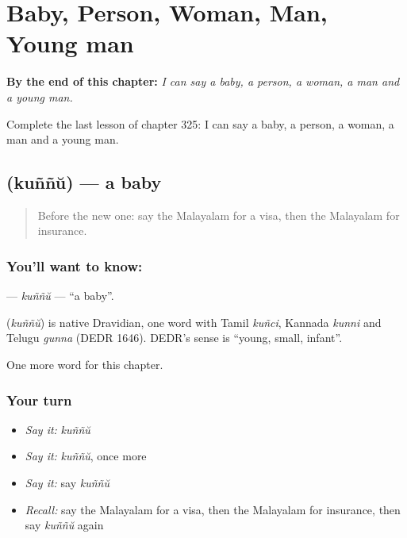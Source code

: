
\chapter{Baby, Person, Woman, Man, Young man}
\label{ch:ml-baby-person-woman-man-young-man}

\begin{chapteropening}
\textbf{By the end of this chapter:} \emph{I can say a baby, a person, a woman, a man and a young man.}

Complete the last lesson of chapter 325: I can say a baby, a person, a woman, a man and a young man.
\end{chapteropening}

\section[\texorpdfstring{\ml{കുഞ്ഞ്} (kuññŭ)}{കുഞ്ഞ് (kuññŭ)}]{ (kuññŭ) — a baby}

\label{lesson:ML-C325-kunnu2}



\begin{quote}
Before the new one: say the Malayalam for a visa, then the Malayalam for insurance.
\end{quote}

\subsection*{You'll want to know: }
\textbf{} — \emph{kuññŭ} — \textquotedblleft{}a baby\textquotedblright{}.

\begin{cousinweb}
\textbf{} (\emph{kuññŭ}) is native Dravidian, one word with Tamil \emph{kuñci}, Kannada \emph{kunni} and Telugu \emph{gunna} (DEDR 1646). DEDR's sense is \textquotedblleft{}young, small, infant\textquotedblright{}.
\end{cousinweb}

\begin{grammarlens}[title={What you've built}]
One more word for this chapter.
\end{grammarlens}

\subsection*{Your turn}
\begin{itemize}
\raggedright
  \item \emph{Say it:} \emph{kuññŭ}
  \item \emph{Say it:} \emph{kuññŭ}, once more
  \item \emph{Say it:} say \emph{kuññŭ}
  \item \emph{Recall:} say the Malayalam for a visa, then the Malayalam for insurance, then say \emph{kuññŭ} again
\end{itemize}

